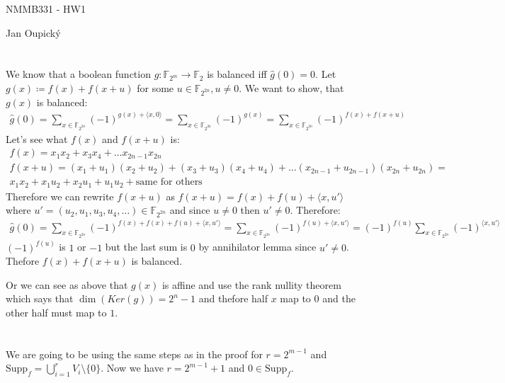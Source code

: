 \documentclass[12pt, a4paper]{article}
\begin{document}
\begin{center}
\large NMMB331 - HW1

\normalsize Jan Oupický
\end{center}
\vspace{1\baselineskip}

\section{}
We know that a boolean function $g: \mathbb{F}_{2^m} \rightarrow \mathbb{F}_2$ is balanced iff $\hat{g}(0) = 0$. Let $g(x) \coloneqq f(x)+f(x+u)$ for some $u \in \mathbb{F}_{2^{2n}}, u \neq 0$. We want to show, that $g(x)$ is balanced:
\begin{gather*}
\hat{g}(0) = \sum\limits_{x \in \mathbb{F}_{2^{2n}}} (-1)^{g(x)+\langle x,0 \rangle} = \sum\limits_{x \in \mathbb{F}_{2^{2n}}} (-1)^{g(x)} = \sum\limits_{x \in \mathbb{F}_{2^{2n}}} (-1)^{f(x)+f(x+u)}
\end{gather*}
Let's see what $f(x)$ and $f(x+u)$ is:
\begin{gather*}
f(x) = x_1 x_2 + x_3 x_4 + \dots x_{2n-1} x_{2n}\\
f(x+u) = (x_1+u_1) (x_2+u_2) + (x_3+u_3) (x_4+u_4) + \dots (x_{2n-1}+u_{2n-1}) (x_{2n}+u_{2n}) =\\
x_1 x_2 + x_1 u_2 + x_2 u_1 + u_1 u_2 + \text{same for others}
\end{gather*}
Therefore we can rewrite $f(x+u)$ as $f(x+u)=f(x)+f(u)+\langle x,u' \rangle$ where $u' = (u_2,u_1,u_3,u_4,\dots) \in \mathbb{F}_{2^{2n}}$ and since $u \neq 0$ then $u' \neq 0$. Therefore:
\begin{gather*}
\hat{g}(0) = \sum\limits_{x \in \mathbb{F}_{2^{2n}}} (-1)^{f(x)+f(x)+f(u)+\langle x,u' \rangle} = \sum\limits_{x \in \mathbb{F}_{2^{2n}}} (-1)^{f(u)+\langle x,u' \rangle} = (-1)^{f(u)}\sum\limits_{x \in \mathbb{F}_{2^{2n}}} (-1)^{\langle x,u' \rangle}
\end{gather*}
$(-1)^{f(u)}$ is $1$ or $-1$ but the last sum is $0$ by annihilator lemma since $u' \neq 0$. Thefore $f(x)+f(x+u)$ is balanced.

Or we can see as above that $g(x)$ is affine and use the rank nullity theorem which says that $\dim(Ker(g)) = 2^n-1$ and thefore half $x$ map to $0$ and the other half must map to $1$.
\section{}
We are going to be using the same steps as in the proof for $r = 2^{m-1}$ and \\$\text{Supp}_f = \bigcup\limits_{i=1}^{r} V_i \setminus \{0\}$. Now we have $r = 2^{m-1}+1$ and $0 \in \text{Supp}_f$. 
\end{document}
